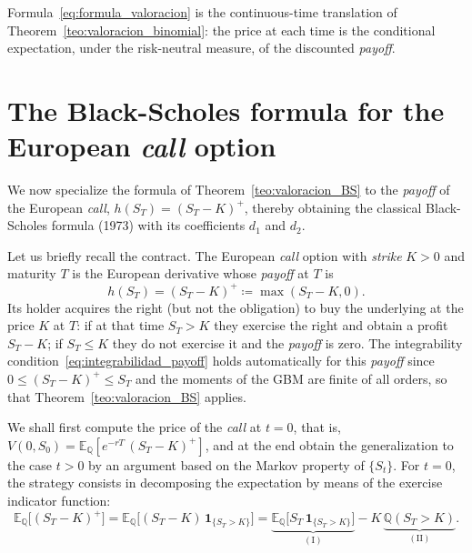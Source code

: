\documentclass[11pt,a4paper,oneside]{report}
\theoremstyle{plain}
\theoremstyle{definition}
\theoremstyle{remark}
\newcommand{\E}{\mathbb{E}}
\newcommand{\Q}{\mathbb{Q}}
\newcommand{\1}{\mathbf{1}}
\newcommand{\eqdef}{\coloneqq}
\begin{document}
Formula~\eqref{eq:formula_valoracion} is the continuous-time
translation of Theorem~\ref{teo:valoracion_binomial}: the price at
each time is the conditional expectation, under the risk-neutral
measure, of the discounted \emph{payoff}.

\section{The Black-Scholes formula for the European \emph{call} option}
\label{sec:formula_bs}

We now specialize the formula of Theorem~\ref{teo:valoracion_BS} to
the \emph{payoff} of the European \emph{call}, $h(S_T) = (S_T - K)^+$,
thereby obtaining the classical Black-Scholes formula (1973) with its
coefficients $d_1$ and $d_2$.

Let us briefly
recall the contract. The European \emph{call} option with
\emph{strike} $K > 0$ and maturity $T$ is the European derivative
whose \emph{payoff} at $T$ is
\begin{equation}\label{eq:payoff_call}
  h(S_T) = (S_T - K)^+ \eqdef \max(S_T - K, 0).
\end{equation}
Its holder acquires the right (but not the obligation) to buy the
underlying at the price $K$ at $T$: if at that time $S_T > K$ they
exercise the right and obtain a profit $S_T - K$; if $S_T \leq K$
they do not exercise it and the \emph{payoff} is zero. The
integrability condition~\eqref{eq:integrabilidad_payoff} holds
automatically for this \emph{payoff} since
$0 \leq (S_T - K)^+ \leq S_T$ and the moments of the GBM are finite
of all orders, so that Theorem~\ref{teo:valoracion_BS} applies.

We shall first
compute the price of the \emph{call} at $t = 0$, that is,
$V(0, S_0) = \E_\Q[e^{-rT}\, (S_T - K)^+]$, and at the end obtain the
generalization to the case $t > 0$ by an argument based on the Markov
property of $\{S_t\}$. For $t = 0$, the strategy consists in
decomposing the expectation by means of the exercise indicator
function:
\begin{equation}\label{eq:descomposicion_call}
  \E_\Q\bigl[(S_T - K)^+\bigr]
  = \E_\Q\bigl[(S_T - K)\, \mathbf{1}_{\{S_T > K\}}\bigr]
  = \underbrace{\E_\Q\bigl[S_T\, \mathbf{1}_{\{S_T > K\}}\bigr]}_{(\mathrm{I})}
   - K\, \underbrace{\Q(S_T > K)}_{(\mathrm{II})}.
\end{equation}
\end{document}
